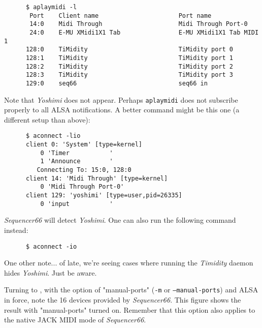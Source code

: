    \begin{verbatim}
      $ aplaymidi -l
       Port    Client name                      Port name
       14:0    Midi Through                     Midi Through Port-0
       24:0    E-MU XMidi1X1 Tab                E-MU XMidi1X1 Tab MIDI 1
      128:0    TiMidity                         TiMidity port 0
      128:1    TiMidity                         TiMidity port 1
      128:2    TiMidity                         TiMidity port 2
      128:3    TiMidity                         TiMidity port 3
      129:0    seq66                            seq66 in
   \end{verbatim}


   Note that \textsl{Yoshimi} does not appear.  Perhaps
   \texttt{aplaymidi} does not subscribe properly to all ALSA notifications.
   A better command might be this one (a different setup than above):

   \begin{verbatim}
      $ aconnect -lio
      client 0: 'System' [type=kernel]
          0 'Timer           '
          1 'Announce        '
         Connecting To: 15:0, 128:0
      client 14: 'Midi Through' [type=kernel]
          0 'Midi Through Port-0'
      client 129: 'yoshimi' [type=user,pid=26335]
          0 'input           '
   \end{verbatim}

   \textsl{Sequencer66} will detect \textsl{Yoshimi}.
   One can also run the following command instead:

   \begin{verbatim}
      $ aconnect -io
   \end{verbatim}

   One other note... of late, we're seeing cases where running the
   \textsl{Timidity} daemon hides \textsl{Yoshimi}.  Just be aware.

%

   Turning to ,
   with the option of "manual-ports" (\texttt{-m} or
   \texttt{--manual-ports}) and ALSA in force,
   note the 16 devices provided by \textsl{Sequencer66}.
   This figure shows the result with "manual-ports" turned on.
   Remember that this option also applies to the native JACK MIDI
   mode of \textsl{Sequencer66}.

